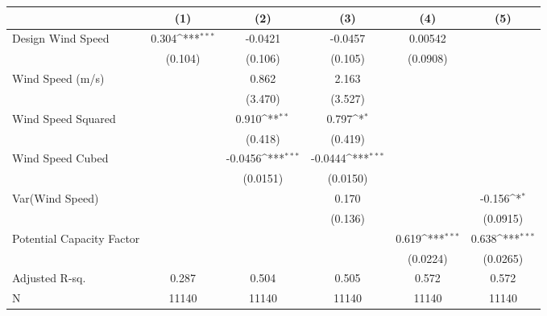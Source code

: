 {
\def\sym#1{\ifmmode^{#1}\else\(^{#1}\)\fi}
\begin{tabular}{l*{5}{c}}
\toprule
                &\multicolumn{1}{c}{(1)}         &\multicolumn{1}{c}{(2)}         &\multicolumn{1}{c}{(3)}         &\multicolumn{1}{c}{(4)}         &\multicolumn{1}{c}{(5)}         \\
\midrule
Design Wind Speed&    0.304\sym{***}&  -0.0421         &  -0.0457         &  0.00542         &                  \\
                &  (0.104)         &  (0.106)         &  (0.105)         & (0.0908)         &                  \\
\addlinespace
Wind Speed (m/s)&                  &    0.862         &    2.163         &                  &                  \\
                &                  &  (3.470)         &  (3.527)         &                  &                  \\
\addlinespace
Wind Speed Squared&                  &    0.910\sym{**} &    0.797\sym{*}  &                  &                  \\
                &                  &  (0.418)         &  (0.419)         &                  &                  \\
\addlinespace
Wind Speed Cubed&                  &  -0.0456\sym{***}&  -0.0444\sym{***}&                  &                  \\
                &                  & (0.0151)         & (0.0150)         &                  &                  \\
\addlinespace
Var(Wind Speed) &                  &                  &    0.170         &                  &   -0.156\sym{*}  \\
                &                  &                  &  (0.136)         &                  & (0.0915)         \\
\addlinespace
Potential Capacity Factor&                  &                  &                  &    0.619\sym{***}&    0.638\sym{***}\\
                &                  &                  &                  & (0.0224)         & (0.0265)         \\
\midrule
Adjusted R-sq.  &    0.287         &    0.504         &    0.505         &    0.572         &    0.572         \\
N               &    11140         &    11140         &    11140         &    11140         &    11140         \\
\bottomrule
\end{tabular}
}
